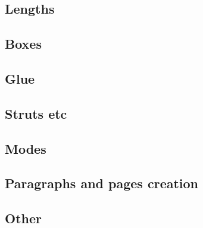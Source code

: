 \graphicspath{{sec03/images/}{sec03/code/}}
\lstset{inputpath=sec03/code/}

\subsection{Lengths}

\subsection{Boxes}

\subsection{Glue}

\subsection{Struts etc}

\subsection{Modes}

\subsection{Paragraphs and pages creation}

\subsection{Other}
